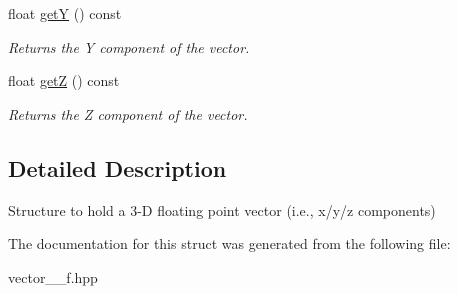 \begin{DoxyCompactItemize}
\mbox{\label{structhebi_1_1Vector3f_a6edafbc6b8a414bbd06d26c4adda7486}} 
float \hyperlink{structhebi_1_1Vector3f_a6edafbc6b8a414bbd06d26c4adda7486}{getY} () const
\begin{DoxyCompactList}\small\item\em Returns the Y component of the vector. \end{DoxyCompactList}\item 
\mbox{\label{structhebi_1_1Vector3f_a7ae80ceb169c5ea160760f0d4e1c7143}} 
float \hyperlink{structhebi_1_1Vector3f_a7ae80ceb169c5ea160760f0d4e1c7143}{getZ} () const
\begin{DoxyCompactList}\small\item\em Returns the Z component of the vector. \end{DoxyCompactList}\end{DoxyCompactItemize}


\subsection{Detailed Description}
Structure to hold a 3-\/D floating point vector (i.\+e., x/y/z components) 

The documentation for this struct was generated from the following file\+:\begin{DoxyCompactItemize}
\item 
vector\+\_\+\_\+f.\+hpp\end{DoxyCompactItemize}

